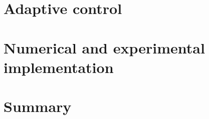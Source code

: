 \clearpage
\section{Adaptive control}
\label{sec: chap2 section header}


\clearpage
\section{Numerical and experimental implementation}
\label{sec: chap2 section header}


\section{Summary}



